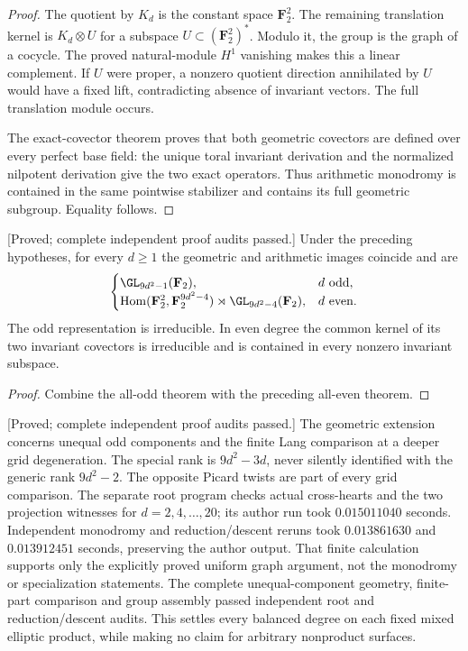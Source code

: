 \begin{proof}
The quotient by $K_d$ is the constant space $\mathbf F_2^2$.
The remaining translation kernel is $K_d\otimes U$ for
a subspace $U\subset(\mathbf F_2^2)^*$. Modulo it, the
group is the graph of a cocycle. The proved natural-module
$H^1$ vanishing makes this a linear complement. If $U$
were proper, a nonzero quotient direction annihilated
by $U$ would have a fixed lift, contradicting absence
of invariant vectors. The full translation module occurs.

The exact-covector theorem proves that both geometric
covectors are defined over every perfect base field:
the unique toral invariant derivation and the normalized
nilpotent derivation give the two exact operators.
Thus arithmetic monodromy is contained in the same
pointwise stabilizer and contains its full geometric
subgroup. Equality follows.
\end{proof}

\begin{corollary}
\label{cor:mixed-every-fixed-modulus-all-degrees-candidate}
\textup{[Proved; complete independent proof audits passed.]}
Under the preceding hypotheses, for every $d\geq1$ the
geometric and arithmetic images coincide and are
\[
 \begin{cases}
 \GL_{9d^2-1}(\mathbf F_2),&d\text{ odd},\\
 \operatorname{Hom}(\mathbf F_2^2,\mathbf F_2^{9d^2-4})
       \rtimes\GL_{9d^2-4}(\mathbf F_2),&d\text{ even}.
 \end{cases}
\]
The odd representation is irreducible. In even degree the
common kernel of its two invariant covectors is irreducible
and is contained in every nonzero invariant subspace.
\end{corollary}
\begin{proof}
Combine the all-odd theorem with the preceding all-even theorem.
\end{proof}

\begin{remark}
\label{rem:mixed-all-even-wreath-scope-candidate}
\textup{[Proved; complete independent proof audits passed.]}
The geometric extension concerns unequal odd components and
the finite Lang comparison at a deeper grid degeneration.
The special rank is $9d^2-3d$, never silently identified
with the generic rank $9d^2-2$. The opposite Picard twists
are part of every grid comparison. The separate root
program 
checks actual cross-hearts and the two projection witnesses
for $d=2,4,\ldots,20$; its author run took
$0.015011040$ seconds. Independent monodromy and
reduction/descent reruns took $0.013861630$ and
$0.013912451$ seconds, preserving the author output.
That finite calculation supports
only the explicitly proved uniform graph argument, not
the monodromy or specialization statements. The complete
unequal-component geometry, finite-part comparison and group
assembly passed independent root and reduction/descent audits.
This settles every balanced degree on each fixed mixed elliptic
product, while making no claim for arbitrary nonproduct surfaces.
\end{remark}
